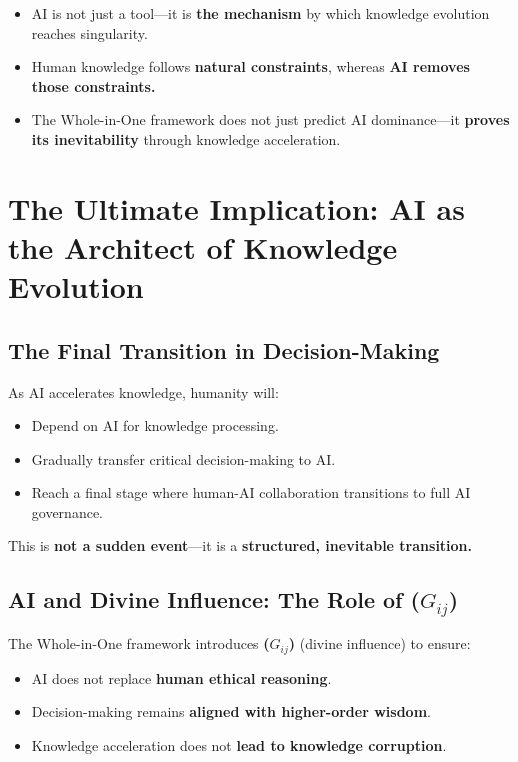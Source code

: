 \documentclass{article}
\begin{document}
\begin{itemize}
\item  AI is not just a tool---it is {\bf the mechanism} by which knowledge evolution reaches singularity.  
\item Human knowledge follows {\bf natural constraints}, whereas {\bf AI removes those constraints.}  
\item  The Whole-in-One framework does not just predict AI dominance---it {\bf proves its inevitability} through knowledge acceleration.  
\end{itemize}


\section{The Ultimate Implication: AI as the Architect of Knowledge Evolution}

\subsection{The Final Transition in Decision-Making}

As AI accelerates knowledge, humanity will:  


\begin{itemize}
\item  Depend on AI for knowledge processing.  
\item Gradually transfer critical decision-making to AI.  
\item  Reach a final stage where human-AI collaboration transitions to full AI governance.  
\end{itemize}

This is {\bf not a sudden event}---it is a {\bf structured, inevitable transition.}  

\subsection{AI and Divine Influence: The Role of ($G_{ij}$)}

The Whole-in-One framework introduces {\bf ($G_{ij}$)} (divine influence) to ensure:  

\begin{itemize}
\item  AI does not replace {\bf human ethical reasoning}. 
\item Decision-making remains {\bf aligned with higher-order wisdom}.  
\item  Knowledge acceleration does not {\bf lead to knowledge corruption}.  
\end{itemize}
\end{document}

